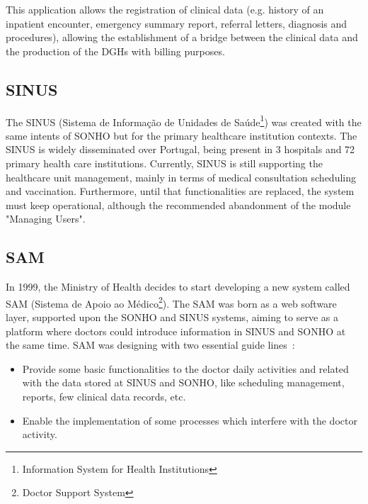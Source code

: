 This application allows the registration of clinical data (e.g. history of an inpatient encounter, emergency summary report, referral letters, diagnosis and procedures), allowing the establishment of a bridge between the clinical data and the production of the DGHs with billing purposes.~\citep{GDHSONHO2011}



\subsection{SINUS}

The SINUS (Sistema de Informação de Unidades de Saúde\footnote{Information System for Health Institutions}) was created with the same intents of SONHO but for the primary healthcare institution contexts. The SINUS is widely disseminated over Portugal, being present in 3 hospitals and 72 primary health care institutions. Currently, SINUS is still supporting the healthcare unit management, mainly in terms of medical consultation scheduling and vaccination. Furthermore, until that functionalities are replaced, the system must keep operational, although the recommended abandonment of the module "Managing Users".~\citep{Saude2010}


\subsection{SAM}

In 1999, the Ministry of Health decides to start developing a new system called SAM (Sistema de Apoio ao Médico\footnote{Doctor Support System}). The SAM was born as a web software layer, supported upon the SONHO and SINUS systems, aiming to serve as a platform where doctors could introduce information in SINUS and SONHO at the same time. SAM was designing with two essential guide lines~\citep{Castanheira2005, ACSS_SAM2010}:
\begin{itemize}
\item Provide some basic functionalities to the doctor daily activities and related with the data stored at SINUS and SONHO, like scheduling management, reports, few clinical data records, etc.
\item Enable the implementation of some processes which interfere with the doctor activity.
\end{itemize}



